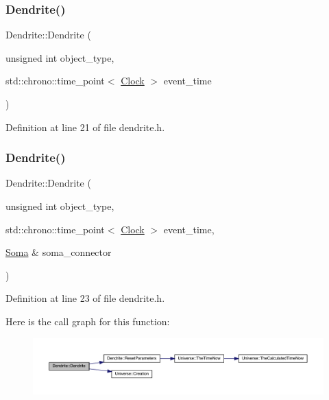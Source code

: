 \subsubsection{\texorpdfstring{Dendrite()}{Dendrite()}\hspace{0.1cm}{\footnotesize\ttfamily [3/4]}}
{\footnotesize\ttfamily Dendrite\+::\+Dendrite (\begin{DoxyParamCaption}\item[{unsigned int}]{object\+\_\+type,  }\item[{std\+::chrono\+::time\+\_\+point$<$ \mbox{\hyperlink{universe_8h_a0ef8d951d1ca5ab3cfaf7ab4c7a6fd80}{Clock}} $>$}]{event\+\_\+time }\end{DoxyParamCaption})\hspace{0.3cm}{\ttfamily [inline]}}



Definition at line 21 of file dendrite.\+h.

\mbox{\label{class_dendrite_ac358d84fb75919386aced214fa0e1107}} 
\subsubsection{\texorpdfstring{Dendrite()}{Dendrite()}\hspace{0.1cm}{\footnotesize\ttfamily [4/4]}}
{\footnotesize\ttfamily Dendrite\+::\+Dendrite (\begin{DoxyParamCaption}\item[{unsigned int}]{object\+\_\+type,  }\item[{std\+::chrono\+::time\+\_\+point$<$ \mbox{\hyperlink{universe_8h_a0ef8d951d1ca5ab3cfaf7ab4c7a6fd80}{Clock}} $>$}]{event\+\_\+time,  }\item[{\mbox{\hyperlink{class_soma}{Soma}} \&}]{soma\+\_\+connector }\end{DoxyParamCaption})\hspace{0.3cm}{\ttfamily [inline]}}



Definition at line 23 of file dendrite.\+h.

Here is the call graph for this function\+:\nopagebreak
\begin{figure}[H]
\begin{center}
\leavevmode
\includegraphics[width=350pt]{class_dendrite_ac358d84fb75919386aced214fa0e1107_cgraph}
\end{center}
\end{figure}
\mbox{\label{class_dendrite_a616c3f82655d8a3cf9cebc22e7aa2233}} 
